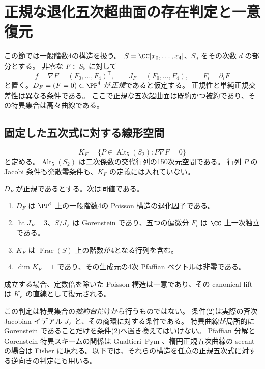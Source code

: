 \section{正規な退化五次超曲面の存在判定と一意復元}
\label{sec:normal}

この節では一般階数4の構造を扱う。
$S=\CC[x_0,\ldots,x_4]$、$S_d$ をその次数 $d$ の部分とする。
非零な $F\in S_5$ に対して
\[
 f=\nabla F=(F_0,\ldots,F_4)^{\mathsf T},\qquad
 J_F=(F_0,\ldots,F_4),\qquad F_i=\partial_iF
\]
と置く。$D_F=(F=0)\subset\PP^4$ が\emph{正規}であると仮定する。
正規性と単純正規交差性は異なる条件である。
ここで正規な五次超曲面は既約かつ被約であり、その特異集合は高々曲線である。

\subsection{固定した五次式に対する線形空間}

\[
 K_F=\{P\in\operatorname{Alt}_5(S_2):P\nabla F=0\}
\]
と定める。$\operatorname{Alt}_5(S_2)$ は二次係数の交代行列の150次元空間である。
行列 $P$ の Jacobi 条件も発散零条件も、$K_F$ の定義には入れていない。

\begin{theorem}[正規五次式の同値な判定条件]\label{thm:normal}
$D_F$ が正規であるとする。次は同値である。
\begin{enumerate}
\item $D_F$ は $\PP^4$ 上の一般階数4の Poisson 構造の退化因子である。
\item $\operatorname{ht}J_F=3$、$S/J_F$ は Gorenstein であり、五つの偏微分 $F_i$ は $\CC$ 上一次独立である。
\item $K_F$ は $\operatorname{Frac}(S)$ 上の階数が4となる行列を含む。
\item $\dim K_F=1$ であり、その生成元の4次 Pfaffian ベクトルは非零である。
\end{enumerate}
成立する場合、定数倍を除いた Poisson 構造は一意であり、その canonical lift は $K_F$ の直線として復元される。
\end{theorem}

この判定は特異集合の\emph{被約台}だけから行うものではない。
条件(2)は実際の斉次 Jacobian イデアル $J_F$ と、その商環に対する条件である。
特異曲線が局所的に Gorenstein であることだけを条件(2)へ置き換えてはいけない。
Pfaffian 分解と Gorenstein 特異スキームの関係は
Gualtieri--Pym \cite{GP}、楕円正規五次曲線の secant の場合は Fisher \cite[\S10]{Fisher}
に現れる。以下では、それらの構造を任意の正規五次式に対する逆向きの判定にも用いる。

